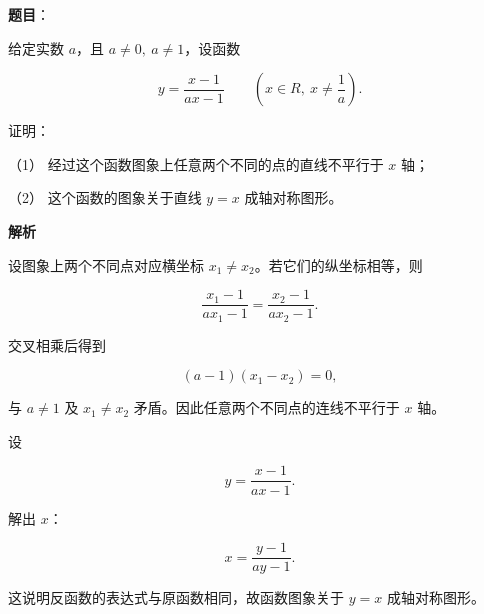 \begin{answer}

\textbf{题目}：

给定实数 $a$，且 $a\ne0,\ a\ne1$，设函数

\nopagebreak[4]
\[
y=\frac{x-1}{ax-1}
\qquad\left(x\in R,\ x\ne\frac1a\right).
\]

证明：

（1） 经过这个函数图象上任意两个不同的点的直线不平行于 $x$ 轴；

（2） 这个函数的图象关于直线 $y=x$ 成轴对称图形。

\textbf{解析}


设图象上两个不同点对应横坐标 $x_1\ne x_2$。若它们的纵坐标相等，则

\nopagebreak[4]
\[
\frac{x_1-1}{ax_1-1}
=\frac{x_2-1}{ax_2-1}.
\]

交叉相乘后得到

\nopagebreak[4]
\[
(a-1)(x_1-x_2)=0,
\]

与 $a\ne1$ 及 $x_1\ne x_2$ 矛盾。因此任意两个不同点的连线不平行于 $x$ 轴。


设

\nopagebreak[4]
\[
y=\frac{x-1}{ax-1}.
\]

解出 $x$：

\nopagebreak[4]
\[
x=\frac{y-1}{ay-1}.
\]

这说明反函数的表达式与原函数相同，故函数图象关于 $y=x$ 成轴对称图形。



\end{answer}
